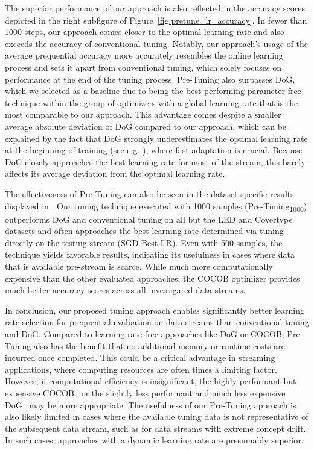 \documentclass{article} %
\begin{document}
The superior performance of our approach is also reflected in the accuracy scores depicted in the right subfigure of Figure~\ref{fig:pretune_lr_accuracy}.
In fewer than 1000 steps, our approach comes closer to the optimal learning rate and also exceeds the accuracy of conventional tuning.
Notably, our approach's usage of the average prequential accuracy more accurately resembles the online learning process and sets it apart from conventional tuning, which solely focuses on performance at the end of the tuning process.
Pre-Tuning also surpasses DoG, which we selected as a baseline due to being the best-performing parameter-free technique within the group of optimizers with a global learning rate that is the most comparable to our approach.
This advantage comes despite a smaller average absolute deviation of DoG compared to our approach, which can be explained by the fact that DoG strongly underestimates the optimal learning rate at the beginning of training (see e.g. ), where fast adaptation is crucial.
Because DoG closely approaches the best learning rate for most of the stream, this barely affects its average deviation from the optimal learning rate.

The effectiveness of Pre-Tuning can also be seen in the dataset-specific results displayed in .
Our tuning technique executed with 1000 samples (Pre-Tuning\textsubscript{1000}) outperforms DoG and conventional tuning on all but the LED and Covertype datasets and often approaches the best learning rate determined via tuning directly on the testing stream (SGD Best LR).
Even with 500 samples, the technique yields favorable results, indicating its usefulness in cases where data that is available pre-stream is scarce.
While much more computationally expensive than the other evaluated approaches, the COCOB optimizer provides much better accuracy scores across all investigated data streams.

In conclusion, our proposed tuning approach enables significantly better learning rate selection for prequential evaluation on data streams than conventional tuning and DoG.
Compared to learning-rate-free approaches like DoG or COCOB, Pre-Tuning also has the benefit that no additional memory or runtime costs are incurred once completed.
This could be a critical advantage in streaming applications, where computing resources are often times a limiting factor.
However, if computational efficiency is insignificant, the highly performant but expensive COCOB~\citep{orabonaTrainingDeepNetworks2017} or the slightly less performant and much less expensive DoG~\citep{ivgiDoGSGDBest2023} may be more appropriate.
The usefulness of our Pre-Tuning approach is also likely limited in cases where the available tuning data is not representative of the subsequent data stream, such as for data streams with extreme concept drift.
In such cases, approaches with a dynamic learning rate are presumably superior.
\end{document}
